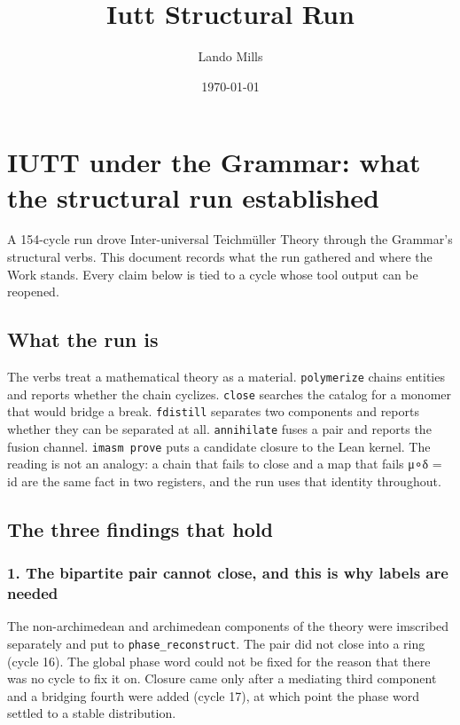 \documentclass[12pt,a4paper]{article}
\title{Iutt Structural Run}
\date{\today}
\author{Lando Mills}
\begin{document}
\maketitle
\hypertarget{iutt-under-the-grammar-what-the-structural-run-established}{%
\section{IUTT under the Grammar: what the structural run
established}\label{iutt-under-the-grammar-what-the-structural-run-established}}

A 154-cycle run drove Inter-universal Teichmüller Theory through the
Grammar's structural verbs. This document records what the run gathered
and where the Work stands. Every claim below is tied to a cycle whose
tool output can be reopened.

\hypertarget{what-the-run-is}{%
\subsection{What the run is}\label{what-the-run-is}}

The verbs treat a mathematical theory as a material. \texttt{polymerize}
chains entities and reports whether the chain cyclizes. \texttt{close}
searches the catalog for a monomer that would bridge a break.
\texttt{fdistill} separates two components and reports whether they can
be separated at all. \texttt{annihilate} fuses a pair and reports the
fusion channel. \texttt{imasm\ prove} puts a candidate closure to the
Lean kernel. The reading is not an analogy: a chain that fails to close
and a map that fails μ∘δ = id are the same fact in two
registers, and the run uses that identity throughout.

\hypertarget{the-three-findings-that-hold}{%
\subsection{The three findings that
hold}\label{the-three-findings-that-hold}}

\hypertarget{the-bipartite-pair-cannot-close-and-this-is-why-labels-are-needed}{%
\subsubsection{1. The bipartite pair cannot close, and this is why
labels are
needed}\label{the-bipartite-pair-cannot-close-and-this-is-why-labels-are-needed}}

The non-archimedean and archimedean components of the theory were
imscribed separately and put to \texttt{phase\_reconstruct}. The pair
did not close into a ring (cycle 16). The global phase word could not be
fixed for the reason that there was no cycle to fix it on. Closure came
only after a mediating third component and a bridging fourth were added
(cycle 17), at which point the phase word settled to a stable
distribution.
\end{document}

